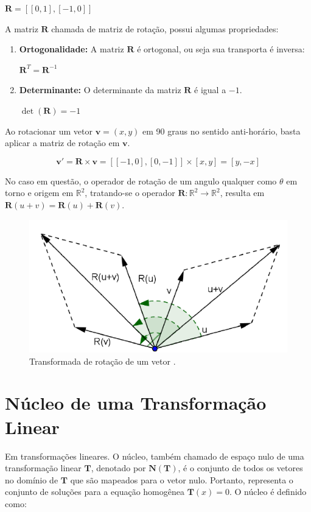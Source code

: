 \centerline{$\mathbf{R} = [[0, 1], [-1, 0]]$}

A matriz $\mathbf{R}$ chamada de matriz de rotação, possui algumas propriedades:

\begin{enumerate}
	\item \textbf{Ortogonalidade:} A matriz $\mathbf{R}$ é ortogonal, ou seja sua transporta é inversa:
	
	\centerline{$\mathbf{R}^T = \mathbf{R}^{-1}$}
	\item \textbf{Determinante:} O determinante da matriz $\mathbf{R}$ é igual a $-1$.
	
	\centerline{$\det(\mathbf{R}) = -1$}
\end{enumerate}

Ao rotacionar um vetor $\mathbf{v} = (x, y)$ em 90 graus  no sentido anti-horário, basta aplicar a matriz de rotação em $\mathbf{v}$.

\begin{equation}
\mathbf{v}' = \mathbf{R} \times \mathbf{v} = [[-1, 0], [0, -1]] \times [x, y] = [y, -x]
\end{equation}

No caso em questão, o operador de rotação de um angulo qualquer como $\theta$ em torno e origem em $\mathbb{R}^2$, tratando-se o operador $\mathbf{R}: \mathbb{R}^2 \longrightarrow \mathbb{R}^2$, resulta em $\mathbf{R}(u + v) = \mathbf{R}(u) + \mathbf{R}(v)$.

\begin{figure}[H]
	\centering
	\includegraphics[scale=0.90]{t_rotacao.png}
	\caption{Transformada de rotação de um vetor \cite{nogueira2013}.}
\end{figure}

\section{Núcleo de uma Transformação Linear}
Em transformações lineares. O núcleo, também chamado de espaço nulo de uma transformação linear $\mathbf{T}$, denotado por  $\mathbf{N}(\mathbf{T})$, é o conjunto de todos os vetores no domínio de $\mathbf{T}$ que são mapeados para o vetor nulo. Portanto, representa o conjunto de soluções para a equação homogênea $\mathbf{T}(x) = 0$. O núcleo é definido como:

